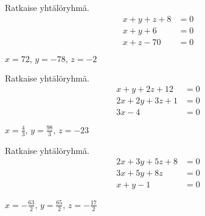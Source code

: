 \begin{tehtavasivu}
\begin{tehtava}
    Ratkaise yhtälöryhmä.
    \begin{align*}
        x+y+z+8 &= 0 \\
        x+y+6 &=0 \\
        x+z-70 &=0
    \end{align*}
    \begin{vastaus}
        $x = 72, \, y = -78, \, z = -2$
    \end{vastaus}
\end{tehtava}

\begin{tehtava}
    Ratkaise yhtälöryhmä.
    \begin{align*}
        x+y+2z+12 &= 0 \\
        2x+2y+3z+1 &=0 \\
        3x-4 &=0
    \end{align*}
    \begin{vastaus}
        $x = \frac{4}{3}, \, y = \frac{98}{3}, \, z = -23$
    \end{vastaus}
\end{tehtava}

\begin{tehtava}
    Ratkaise yhtälöryhmä.
    \begin{align*}
        2x+3y+5z+8 &= 0 \\
        3x+5y+8z &=0 \\
        x+y-1 &=0
    \end{align*}
    \begin{vastaus}
        $x = -\frac{63}{2}, \, y = \frac{65}{2}, \, z = -\frac{17}{2}$
    \end{vastaus}
\end{tehtava}

\end{tehtavasivu}
